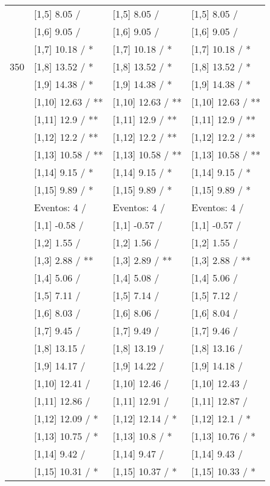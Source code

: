 \begin{table}
\begin{tabular}[t]{llll}
 & {}[1,5] 8.05  / & {}[1,5] 8.05  / & {}[1,5] 8.05  /\\
 & {}[1,6] 9.05  / & {}[1,6] 9.05  / & {}[1,6] 9.05  /\\
 & {}[1,7] 10.18  / * & {}[1,7] 10.18  / * & {}[1,7] 10.18  / *\\
350 & {}[1,8] 13.52  / * & {}[1,8] 13.52  / * & {}[1,8] 13.52  / *\\
\addlinespace
 & {}[1,9] 14.38  / * & {}[1,9] 14.38  / * & {}[1,9] 14.38  / *\\
 & {}[1,10] 12.63  / ** & {}[1,10] 12.63  / ** & {}[1,10] 12.63  / **\\
 & {}[1,11] 12.9  / ** & {}[1,11] 12.9  / ** & {}[1,11] 12.9  / **\\
 & {}[1,12] 12.2  / ** & {}[1,12] 12.2  / ** & {}[1,12] 12.2  / **\\
 & {}[1,13] 10.58  / ** & {}[1,13] 10.58  / ** & {}[1,13] 10.58  / **\\
\addlinespace
 & {}[1,14] 9.15  / * & {}[1,14] 9.15  / * & {}[1,14] 9.15  / *\\
 & {}[1,15] 9.89  / * & {}[1,15] 9.89  / * & {}[1,15] 9.89  / *\\
 & Eventos:  4 / & Eventos:  4 / & Eventos:  4 /\\
 & {}[1,1] -0.58  / & {}[1,1] -0.57  / & {}[1,1] -0.57  /\\
 & {}[1,2] 1.55  / & {}[1,2] 1.56  / & {}[1,2] 1.55  /\\
\addlinespace
 & {}[1,3] 2.88  / ** & {}[1,3] 2.89  / ** & {}[1,3] 2.88  / **\\
 & {}[1,4] 5.06  / & {}[1,4] 5.08  / & {}[1,4] 5.06  /\\
 & {}[1,5] 7.11  / & {}[1,5] 7.14  / & {}[1,5] 7.12  /\\
 & {}[1,6] 8.03  / & {}[1,6] 8.06  / & {}[1,6] 8.04  /\\
 & {}[1,7] 9.45  / & {}[1,7] 9.49  / & {}[1,7] 9.46  /\\
\addlinespace
500 & {}[1,8] 13.15  / & {}[1,8] 13.19  / & {}[1,8] 13.16  /\\
 & {}[1,9] 14.17  / & {}[1,9] 14.22  / & {}[1,9] 14.18  /\\
 & {}[1,10] 12.41  / & {}[1,10] 12.46  / & {}[1,10] 12.43  /\\
 & {}[1,11] 12.86  / & {}[1,11] 12.91  / & {}[1,11] 12.87  /\\
 & {}[1,12] 12.09  / * & {}[1,12] 12.14  / * & {}[1,12] 12.1  / *\\
\addlinespace
 & {}[1,13] 10.75  / * & {}[1,13] 10.8  / * & {}[1,13] 10.76  / *\\
 & {}[1,14] 9.42  / & {}[1,14] 9.47  / & {}[1,14] 9.43  /\\
 & {}[1,15] 10.31  / * & {}[1,15] 10.37  / * & {}[1,15] 10.33  / *\\
\bottomrule
\end{tabular}
\end{table}
